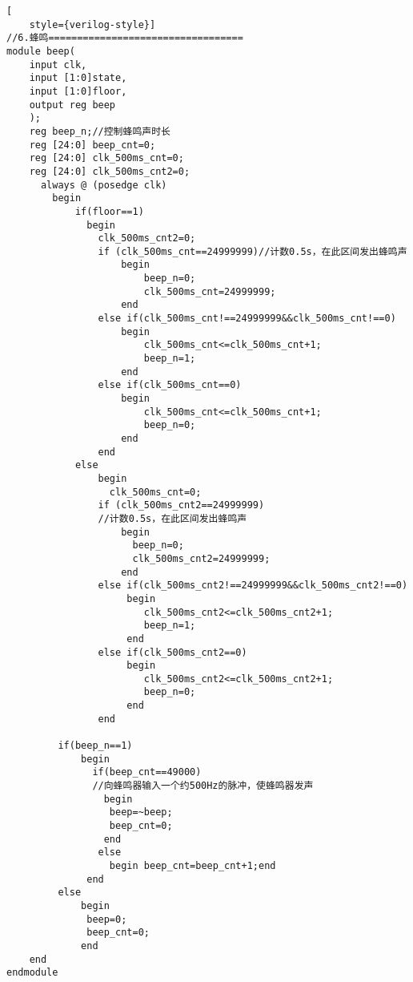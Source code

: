 \begin{lstlisting}[
    style={verilog-style}]
//6.蜂鸣==================================
module beep(
    input clk,
    input [1:0]state,
    input [1:0]floor,
    output reg beep
    );  
    reg beep_n;//控制蜂鸣声时长
    reg [24:0] beep_cnt=0;
    reg [24:0] clk_500ms_cnt=0;
    reg [24:0] clk_500ms_cnt2=0;   
      always @ (posedge clk)
        begin 
            if(floor==1)
              begin
                clk_500ms_cnt2=0;
                if (clk_500ms_cnt==24999999)//计数0.5s，在此区间发出蜂鸣声
                    begin
                        beep_n=0;
                        clk_500ms_cnt=24999999;
                    end
                else if(clk_500ms_cnt!==24999999&&clk_500ms_cnt!==0)
                    begin
                        clk_500ms_cnt<=clk_500ms_cnt+1;
                        beep_n=1;
                    end  
                else if(clk_500ms_cnt==0)
                    begin
                        clk_500ms_cnt<=clk_500ms_cnt+1;
                        beep_n=0;
                    end
                end 
            else
                begin
                  clk_500ms_cnt=0;
                if (clk_500ms_cnt2==24999999)
                //计数0.5s，在此区间发出蜂鸣声
                    begin
                      beep_n=0;
                      clk_500ms_cnt2=24999999;
                    end
                else if(clk_500ms_cnt2!==24999999&&clk_500ms_cnt2!==0)
                     begin
                        clk_500ms_cnt2<=clk_500ms_cnt2+1;
                        beep_n=1;
                     end  
                else if(clk_500ms_cnt2==0)
                     begin
                        clk_500ms_cnt2<=clk_500ms_cnt2+1;
                        beep_n=0;
                     end
                end 

         if(beep_n==1)
             begin
               if(beep_cnt==49000)
               //向蜂鸣器输入一个约500Hz的脉冲，使蜂鸣器发声
                 begin
                  beep=~beep; 
                  beep_cnt=0;
                 end
                else
                  begin beep_cnt=beep_cnt+1;end 
              end    
         else
             begin
              beep=0;
              beep_cnt=0;          
             end          
    end     
endmodule


\end{lstlisting}
